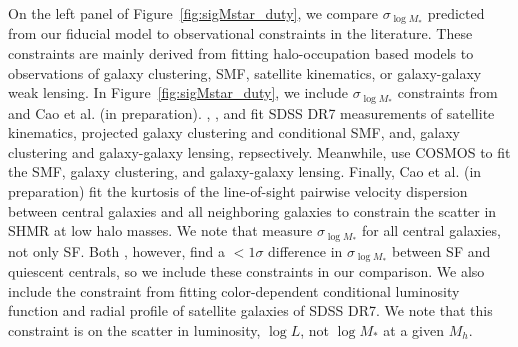\documentclass[12pt, letterpaper, preprint, tighten]{aastex62}
\begin{document}
On the left panel of Figure~\ref{fig:sigMstar_duty}, we compare 
$\sigma_{\log M_*}$ predicted from our fiducial model to observational 
constraints in the literature. These constraints are mainly derived from 
fitting halo-occupation based models to observations of galaxy 
clustering, SMF, satellite kinematics, or galaxy-galaxy weak lensing. In 
Figure~\ref{fig:sigMstar_duty}, we include $\sigma_{\log M_*}$ constraints 
from~\cite{more2011, leauthaud2012, reddick2013, tinker2013, zu2015} and 
Cao et al. (in preparation). \cite{more2011}, \cite{reddick2013}, and \cite{zu2015} 
fit SDSS DR7 measurements of satellite kinematics, projected galaxy clustering and 
conditional SMF, and, galaxy clustering and galaxy-galaxy 
lensing, repsectively. Meanwhile, \cite{leauthaud2012, tinker2013} 
use COSMOS to fit the SMF, galaxy clustering, and galaxy-galaxy lensing. 
Finally, Cao et al. (in preparation) fit the kurtosis of the line-of-sight 
pairwise velocity dispersion between central galaxies and all neighboring 
galaxies to constrain the scatter in SHMR at low halo masses. We note that 
\cite{leauthaud2012, reddick2013, zu2015} measure $\sigma_{\log M_*}$ for 
all central galaxies, not only SF. Both \cite{more2011, tinker2013}, 
however, find a $< 1\sigma$ difference in $\sigma_{\log M_*}$ between SF 
and quiescent centrals, so we include these constraints in our comparison. 
We also include the \cite{lange2018a} constraint from fitting color-dependent 
conditional luminosity function and radial profile of satellite galaxies 
of SDSS DR7. We note that this constraint is on the scatter in luminosity, 
$\log L$, not $\log M_*$ at a given $M_h$. 
\end{document}
